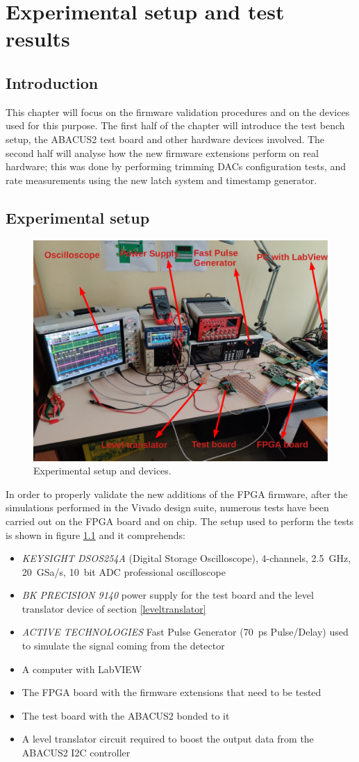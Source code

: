 \chapter{Experimental setup and test results}
\section{Introduction}
This chapter will focus on the firmware validation procedures and on the devices used for this purpose.
The first half of the chapter will introduce the test bench setup, the ABACUS2 test board and other hardware devices involved.
The second half will analyse how the new firmware extensions perform on real hardware; this was done by performing trimming DACs configuration tests, and rate measurements using the new latch system and timestamp generator.

\section{Experimental setup}\label{testbench}
\begin{figure}[H]
	\centering
	\includegraphics[width=0.7\linewidth]{IMG/ch5/TESTBENCH}
	\caption{Experimental setup and devices.}
	\label{fig:testbench}
\end{figure}
In order to properly validate the new additions of the FPGA firmware, after the simulations performed in the Vivado design suite, numerous tests have been carried out on the FPGA board and on chip.
The setup used to perform the tests is shown in figure \ref{fig:testbench} and it comprehends:
\begin{itemize}
	\item \textit{KEYSIGHT DSOS254A} (Digital Storage Oscilloscope), 4-channels, 2.5~GHz, 20~GSa/s, 10~bit ADC professional oscilloscope
	\item \textit{BK PRECISION 9140} power supply for the test board and the level translator device of section \ref{leveltranslator}
	\item \textit{ACTIVE TECHNOLOGIES} Fast Pulse Generator (70~ps Pulse/Delay) used to simulate the signal coming from the detector
	\item A computer with LabVIEW 
	\item The FPGA board with the firmware extensions that need to be tested
	\item The test board with the ABACUS2 bonded to it
	\item A level translator circuit required to boost the output data from the ABACUS2 I2C controller
\end{itemize}

